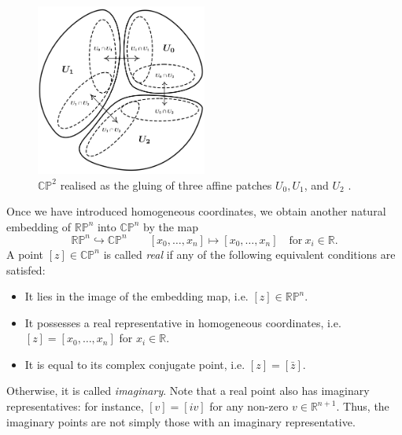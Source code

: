 \documentclass[10pt, a4paper]{article}
\theoremstyle{BoldTopSpacing}
\theoremstyle{BoldTopSpacing}
\theoremstyle{BoldTopSpacing}
\theoremstyle{BoldTopBottomSpacing}
\theoremstyle{BoldTopSpacing}
\theoremstyle{BoldTopBottomSpacing}
\theoremstyle{remark}
\begin{document}
\begin{figure}[H]
    \centering
    \includegraphics[width=0.5\textwidth]{affine-patches.png}
    \caption[$\mathbb{C}\mathbb{P}^2$ realised as the gluing of three affine patches $U_0, U_1$, and $U_2$.]{$\mathbb{C}\mathbb{P}^2$ realised as the gluing of three affine patches $U_0, U_1$, and $U_2$ \cite{toricfanovarieties2005}.}
    \label{fig:affine-patches-diagram}
\end{figure}

Once we have introduced homogeneous coordinates, we obtain another natural embedding of $\mathbb{R}\mathbb{P}^n$ into $\mathbb{C}\mathbb{P}^n$ by the map
\[
    \mathbb{R}\mathbb{P}^n \hookrightarrow \mathbb{C}\mathbb{P}^n \quad \quad [x_{0}, \dots, x_{n}] \mapsto [x_{0}, \dots, x_{n}] \quad \text{for} \ x_{i} \in \mathbb{R}.
\]
A point $[z] \in \mathbb{C}\mathbb{P}^n$ is called \textit{real} if any of the following equivalent conditions are satisfed:
\begin{itemize}[label=$\blacktriangleright$]
    \item It lies in the image of the embedding map, i.e. $[z] \in \mathbb{R}\mathbb{P}^n$.
    \item It possesses a real representative in homogeneous coordinates, i.e. $[z] = [x_{0}, \dots, x_{n}]$ for $x_{i} \in \mathbb{R}$.
    \item It is equal to its complex conjugate point, i.e. $[z] = [\bar{z}]$.
\end{itemize}
Otherwise, it is called \textit{imaginary}. Note that a real point also has imaginary representatives: for instance, $[v] = [i v]$ for any non-zero $v \in \mathbb{R}^{n+1}$. Thus, the imaginary points are not simply those with an imaginary representative.
\end{document}
